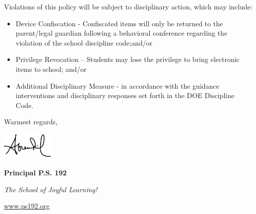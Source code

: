 \documentclass[12pt,letterpaper]{article}
\begin{document}
Violations of this policy will be subject to disciplinary action, which may include:
\begin{itemize}
\item Device Confiscation - Confiscated items will only be returned to the 
parent/legal guardian following a behavioral conference regarding the violation 
of the school discipline code;and/or
\item Privilege Revocation – Students may lose the privilege to bring electronic
items to school; and/or
\item Additional Disciplinary Measure - in accordance with the guidance 
interventions and disciplinary responses set forth in the DOE Discipline Code.
\end{itemize}

Warmest regards,

\includegraphics[width=0.2\textwidth]{hil_signature}

\textbf{Principal P.S. 192}

\textit{The School of Joyful Learning!}

\url{www.ps192.org}
\end{document}
